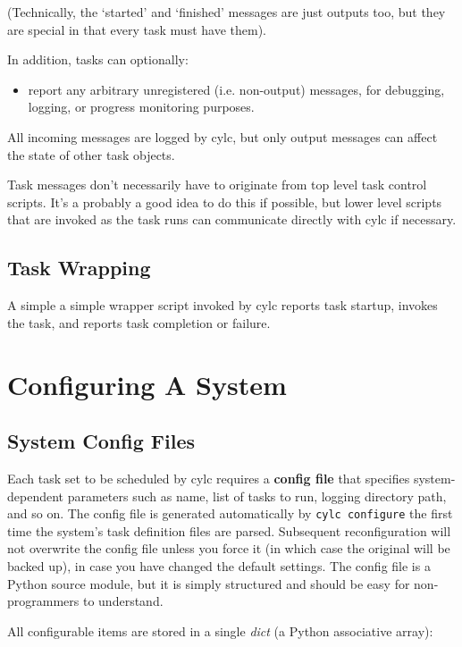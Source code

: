 \documentclass[11pt,a4paper]{article}
\begin{document}
(Technically, the `started' and `finished' messages are just
outputs too, but they are special in that every task
must have them).

In addition, tasks can optionally:

\begin{itemize}
\item report any arbitrary unregistered (i.e. non-output)
messages, for debugging, logging, or progress monitoring purposes.
\end{itemize}

All incoming messages are logged by cylc, but only output messages can
affect the state of other task objects.

Task messages don't necessarily have to originate from top level task
control scripts. It's a probably a good idea to do this if possible, but
lower level scripts that are invoked as the task runs can communicate
directly with cylc if necessary.

\subsection{Task Wrapping}

A simple a simple wrapper script invoked by cylc reports task
startup, invokes the task, and reports task completion or failure. 

\pagebreak
\section{Configuring A System}

\subsection{System Config Files}

Each task set to be scheduled by cylc requires a {\bf config file} that
specifies system-dependent parameters such as name, list of tasks to
run, logging directory path, and so on. The config file is generated
automatically by \lstinline=cylc configure= the first time the system's
task definition files are parsed. Subsequent reconfiguration will not
overwrite the config file unless you force it (in which case the
original will be backed up), in case you have changed the default
settings. The config file is a Python source module, but it is simply
structured and should be easy for non-programmers to understand. 

All configurable items are stored in a single {\em dict} (a Python
associative array):
\end{document}
